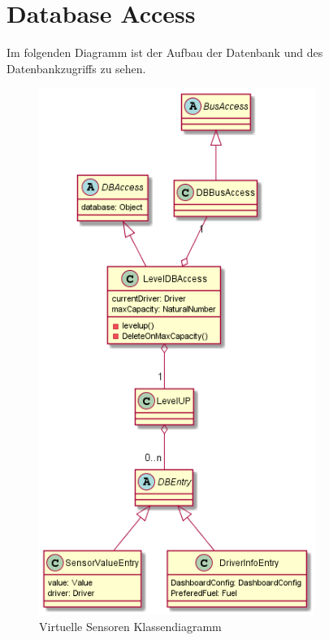 \documentclass[entwurf.tex]{subfiles}
\begin{document}
  	\section{Database Access}
  		Im folgenden Diagramm ist der Aufbau der Datenbank und des Datenbankzugriffs zu sehen.
  		\begin{figure}[H]
  			\begin{center}
 				\includegraphics[width=0.8\textwidth]{diagrams/DBAccess.png}
  				\caption{Virtuelle Sensoren Klassendiagramm}
  			\end{center}
  		\end{figure}
\end{document}
